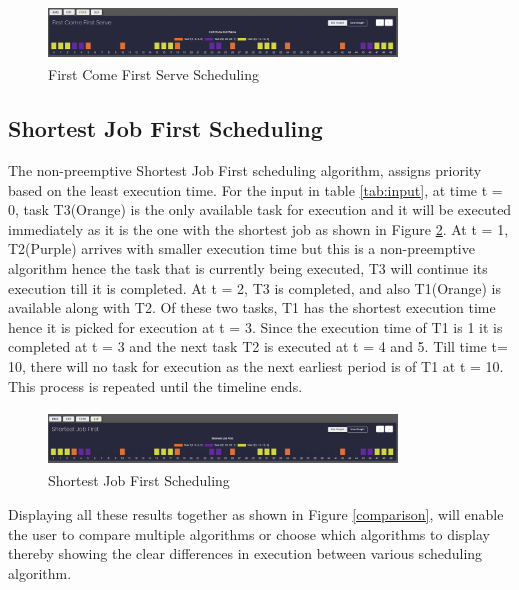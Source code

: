 \documentclass[12pt, conference]{IEEEtran}
\begin{document}
\begin{figure}
\centerline{\includegraphics[width=9.25cm, height=1.5cm]{Output_FCFS.png}}
\caption{First Come First Serve Scheduling}
\label{Output_FCFS}
\end{figure} 


\subsection{Shortest Job First Scheduling}
The non-preemptive Shortest Job First scheduling algorithm, assigns priority based on the least execution time. For the input in table \ref{tab:input}, at time t = 0, task T3(Orange) is the only available task for execution and it will be executed immediately as it is the one with the shortest job as shown in Figure \ref{Output_SJF}. At t = 1, T2(Purple) arrives with smaller execution time but this is a non-preemptive algorithm hence the task that is currently being executed, T3 will continue its execution till it is completed. At t = 2, T3 is completed, and also T1(Orange) is available along with T2. Of these two tasks, T1 has the shortest execution time hence it is picked for execution at t = 3. Since the execution time of T1 is 1 it is completed at t = 3 and the next task T2 is executed at t = 4 and 5. Till time t= 10, there will no task for execution as the next earliest period is of T1 at t = 10. This process is repeated until the timeline ends.\\
\begin{figure}
\centerline{\includegraphics[width=9.25cm, height=1.5cm]{Output_SJF.png}}
\caption{Shortest Job First Scheduling}
\label{Output_SJF}
\end{figure} 

Displaying all these results together as shown in Figure \ref{comparison}, will enable the user to compare multiple algorithms or choose which algorithms to display thereby showing the clear differences in execution between various scheduling algorithm.\\
\end{document}
